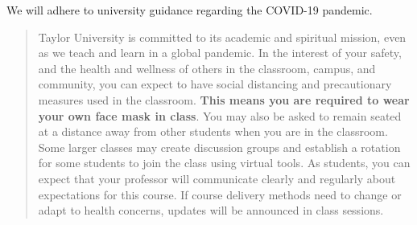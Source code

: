 We will adhere to university guidance regarding the COVID-19 pandemic.
\begin{quote}
  Taylor University is committed to its academic and spiritual mission,
  even as we teach and learn in a global pandemic.
  In the interest of your safety,
  and the health and wellness of others in the classroom, campus, and community,
  you can expect to have social distancing and precautionary measures used in the classroom.
  \textbf{This means you are required to wear your own face mask in class}.
  You may also be asked to remain seated at a distance
  away from other students when you are in the classroom.
  Some larger classes may create discussion groups
  and establish a rotation for some students to join the class
  using virtual tools.
  As students,
  you can expect that your professor will communicate clearly and regularly
  about expectations for this course.
  If course delivery methods need to change or adapt to health concerns,
  updates will be announced in class sessions.
\end{quote}

